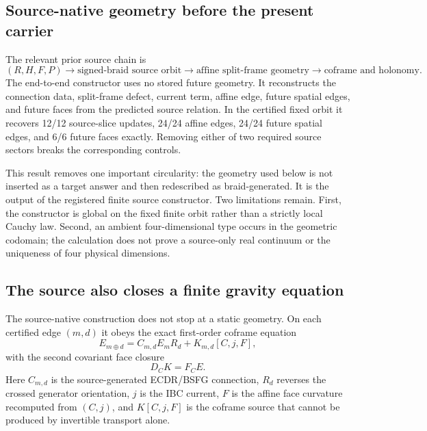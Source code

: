 \documentclass[11pt]{article}
\theoremstyle{definition}
\theoremstyle{remark}
\begin{document}
\subsection{Source-native geometry before the present carrier}

The relevant prior source chain is
\begin{equation}\label{eq:sourcechain}
 (R,H,F,P)
 \longrightarrow \text{signed-braid source orbit}
 \longrightarrow \text{affine split-frame geometry}
 \longrightarrow \text{coframe and holonomy}.
\end{equation}
The end-to-end constructor uses no stored future geometry. It reconstructs the connection data, split-frame defect, current term, affine edge, future spatial edges, and future faces from the predicted source relation. In the certified fixed orbit it recovers 12/12 source-slice updates, 24/24 affine edges, 24/24 future spatial edges, and 6/6 future faces exactly. Removing either of two required source sectors breaks the corresponding controls.

This result removes one important circularity: the geometry used below is not inserted as a target answer and then redescribed as braid-generated. It is the output of the registered finite source constructor. Two limitations remain. First, the constructor is global on the fixed finite orbit rather than a strictly local Cauchy law. Second, an ambient four-dimensional type occurs in the geometric codomain; the calculation does not prove a source-only real continuum or the uniqueness of four physical dimensions.

\subsection{The source also closes a finite gravity equation}

The source-native construction does not stop at a static geometry. On each certified edge $(m,d)$ it obeys the exact first-order coframe equation
\begin{equation}\label{eq:finitegravity}
 E_{m\oplus d}=C_{m,d}E_mR_d+K_{m,d}[C,j,F],
\end{equation}
with the second covariant face closure
\begin{equation}\label{eq:curvatureclosure}
 D_CK=F_CE.
\end{equation}
Here $C_{m,d}$ is the source-generated ECDR/BSFG connection, $R_d$ reverses the crossed generator orientation, $j$ is the IBC current, $F$ is the affine face curvature recomputed from $(C,j)$, and $K[C,j,F]$ is the coframe source that cannot be produced by invertible transport alone.
\end{document}
